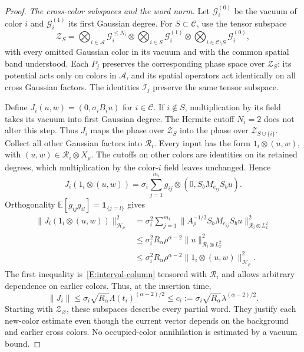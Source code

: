 \documentclass[12pt]{article}
\numberwithin{equation}{section}
\theoremstyle{definition}
\newcommand{\E}{\mathbb{E}}
\begin{document}
\begin{proof}
  \emph{The cross-color subspaces and the word norm.}
  Let $\mathscr G_i^{(0)}$ be the vacuum of color $i$ and
  $\mathscr G_i^{(1)}$ its first Gaussian degree. For
  $S\subset\mathcal C$, use the tensor subspace
  \[
    \mathscr Z_S=
    \bigotimes_{i\in\mathcal A}\mathscr G_i^{\le N_i}
    \otimes\bigotimes_{i\in S}\mathscr G_i^{(1)}
    \otimes\bigotimes_{i\in\mathcal C\setminus S}
    \mathscr G_i^{(0)},
  \]
  with every omitted Gaussian color in its vacuum and with the common
  spatial band understood. Each $P_j$ preserves the corresponding
  phase space over $\mathscr Z_S$: its potential acts only on colors in
  $\mathcal A$, and its spatial operators act identically on all cross
  Gaussian factors. The identities $\mathscr I_j$ preserve the same
  tensor subspace.

  Define $J_i(u,w)=(0,\sigma_i B_i u)$ for $i\in\mathcal C$.
  If $i\notin S$, multiplication by its field takes its vacuum into
  first Gaussian degree. The Hermite cutoff $N_i=2$ does not alter this
  step. Thus $J_i$ maps the phase over $\mathscr Z_S$ into the phase
  over $\mathscr Z_{S\cup\{i\}}$.
  Collect all other Gaussian factors into $\mathscr R_i$.
  Every input has the form $1_i\otimes(u,w)$, with
  $(u,w)\in\mathscr R_i\otimes X_\rho$. The cutoffs on other
  colors are identities on its retained degrees, which multiplication
  by the color-$i$ field leaves unchanged. Hence
  \[
    J_i(1_i\otimes(u,w))
    =\sigma_i\sum_{j=1}^{m_i}g_{ij}\otimes
    (0,S_bM_{e_{ij}}S_bu).
  \]
  Orthogonality $\E[g_{ij}g_{il}]=\mathbf1_{\{j=l\}}$ gives
  \[
    \begin{split}
      \|J_i(1_i\otimes(u,w))\|_{\mathcal H_\rho}^2
      &=\sigma_i^2\sum_{j=1}^{m_i}
      \|A_\rho^{-1/2}S_bM_{e_{ij}}S_bu
      \|_{\mathscr R_i\otimes L^2_x}^2\\
      &\le\sigma_i^2R_\alpha\rho^{\alpha-2}
      \|u\|_{\mathscr R_i\otimes L^2_x}^2\\
      &\le\sigma_i^2R_\alpha\rho^{\alpha-2}
      \|1_i\otimes(u,w)\|_{\mathcal H_\rho}^2.
    \end{split}
  \]
  The first inequality is~\eqref{E:interval-column} tensored with
  $\mathscr R_i$ and allows arbitrary dependence on earlier colors.
  Thus, at the insertion time,
  \begin{equation}\label{E:split-fresh-insertion}
    \|J_i\|\le\sigma_i\sqrt{R_\alpha}
    \Lambda(t_i)^{(\alpha-2)/2}
    \le c_i:=\sigma_i\sqrt{R_\alpha}\lambda^{(\alpha-2)/2}.
  \end{equation}
  Starting with $\mathscr Z_\varnothing$, these subspaces describe every
  partial word. They justify each new-color estimate even though the
  current vector depends on the background and earlier cross colors.
  No occupied-color annihilation is estimated by a vacuum bound.


\end{proof}
\end{document}
